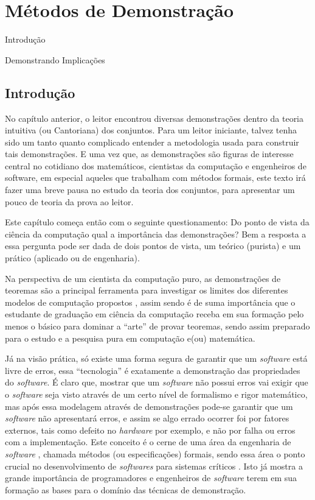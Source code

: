 \chapter{Métodos de Demonstração}\label{cap:Demonstracoes}

\begin{introduction}[Tópicos]
	\item Introdução
	\item Demonstrando Implicações
\end{introduction}

\section{Introdução}\label{sec:Introducao-Demonstracoes}

No capítulo anterior, o leitor encontrou diversas demonstrações dentro da teoria intuitiva (ou Cantoriana) dos conjuntos. Para um leitor iniciante, talvez tenha sido um tanto quanto complicado entender a metodologia usada para construir tais demonstrações. E uma vez que, as demonstrações são figuras de interesse central no cotidiano dos matemáticos, cientistas da computação e engenheiros de software, em especial aqueles que trabalham com métodos formais, este texto irá fazer uma breve pausa no estudo da teoria dos conjuntos, para apresentar um pouco de teoria da prova ao leitor.

Este capítulo começa então com o seguinte questionamento: Do ponto de vista da ciência da computação qual a importância das demonstrações? Bem a resposta a essa pergunta pode ser dada de dois pontos de vista,  um teórico (purista) e um prático (aplicado ou de engenharia).

Na perspectiva de um cientista da computação puro, as demonstrações de teoremas são a principal ferramenta para investigar os limites dos diferentes modelos de computação propostos \cite{hopcroft2008, linz2006}, assim sendo é de suma importância que o estudante de graduação em ciência da computação receba em sua formação pelo menos o básico para dominar a ``arte'' de provar teoremas, sendo assim preparado para o estudo e a pesquisa pura em computação e(ou) matemática.

Já na visão prática, só existe uma forma segura de garantir que um \textit{software} está livre de erros, essa ``tecnologia'' é exatamente a demonstração das propriedades do \textit{software}. É claro que, mostrar que um \textit{software} não possui erros vai exigir que o \textit{software} seja visto através de um certo nível de formalismo e rigor matemático, mas após essa modelagem através de demonstrações pode-se garantir que um \textit{software} não apresentará erros, e assim se algo errado ocorrer foi por fatores externos, tais como defeito no \textit{hardware} por exemplo, e não por falha ou erros com a implementação. Este conceito é o cerne de uma área da engenharia de \textit{software} \cite{pressman2016}, chamada métodos  (ou especificações) formais, sendo essa área o ponto crucial no desenvolvimento de \textit{softwares} para sistemas críticos \cite{sommerville2011}. Isto já mostra a grande importância de programadores e engenheiros de \textit{software} terem em sua formação as bases para o domínio das técnicas de demonstração.

